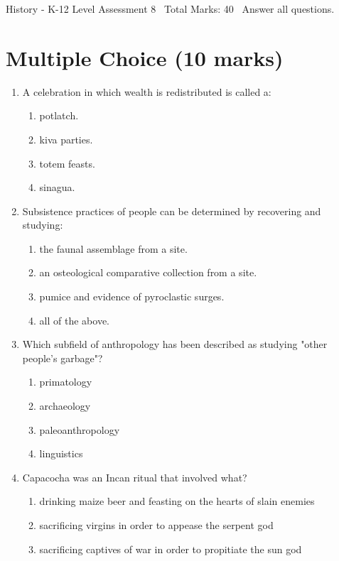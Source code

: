 \documentclass[12pt]{article}
\begin{document}
\begin{center}
History - K-12 Level Assessment 8 \
Total Marks: 40 \
Answer all questions.
\end{center}

\section*{Multiple Choice (10 marks)}
\begin{enumerate}[label=\arabic*.]
\item A celebration in which wealth is redistributed is called a:
\begin{enumerate}[label=(\alph*)]
    \item potlatch.
    \item kiva parties.
    \item totem feasts.
    \item sinagua.
\end{enumerate}
\item Subsistence practices of people can be determined by recovering and studying:
\begin{enumerate}[label=(\alph*)]
    \item the faunal assemblage from a site.
    \item an osteological comparative collection from a site.
    \item pumice and evidence of pyroclastic surges.
    \item all of the above.
\end{enumerate}
\item Which subfield of anthropology has been described as studying "other people's garbage"?
\begin{enumerate}[label=(\alph*)]
    \item primatology
    \item archaeology
    \item paleoanthropology
    \item linguistics
\end{enumerate}
\item Capacocha was an Incan ritual that involved what?
\begin{enumerate}[label=(\alph*)]
    \item drinking maize beer and feasting on the hearts of slain enemies
    \item sacrificing virgins in order to appease the serpent god
    \item sacrificing captives of war in order to propitiate the sun god

\end{enumerate}
\end{enumerate}
\end{document}
